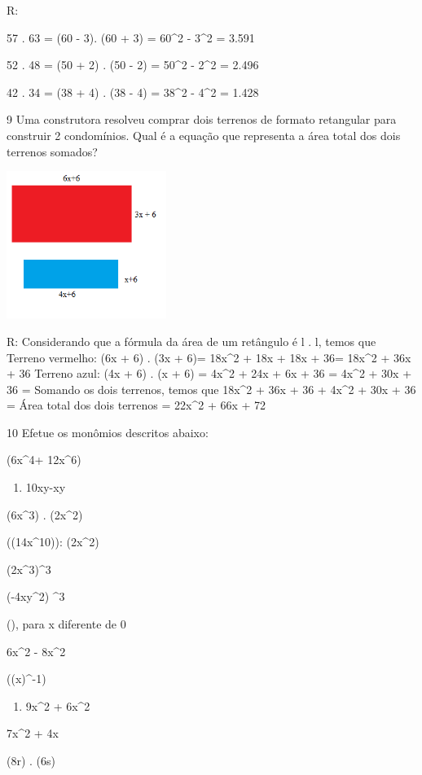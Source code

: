 {R:
\item 57 . 63 = (60 - 3). (60 + 3) = 60^2 - 3^2 = 3.591
\item 52 . 48 = (50 + 2) . (50 - 2) = 50^2 - 2^2 = 2.496
\item 42 . 34 = (38 + 4) . (38 - 4) = 38^2 - 4^2 = 1.428

\num{9} Uma construtora resolveu comprar dois terrenos de formato retangular
para construir 2 condomínios. Qual é a equação que representa a área
total dos dois terrenos somados?

\includegraphics[width=2.04167in,height=1.8873in]{./imgSAEB_8_MAT/media/image5.png}

R: Considerando que a fórmula da área de um retângulo é l . l, temos que
Terreno vermelho:
(6x + 6) . (3x + 6)=
18x^2 + 18x + 18x + 36=
18x^2 + 36x + 36
Terreno azul:
(4x + 6) . (x + 6) =
4x^2 + 24x + 6x + 36 =
4x^2 + 30x + 36 =
Somando os dois terrenos, temos que
18x^2 + 36x + 36 + 4x^2 + 30x + 36 =
Área total dos dois terrenos = 22x^2 + 66x + 72

\num{10} Efetue os monômios descritos abaixo:
\item (6x^4+ 12x^6)

\begin{enumerate}
\def\labelenumi{\alph{enumi})}
\setcounter{enumi}{1}
\tightlist
\item
  10xy-xy
\end{enumerate}
\item(6x^3) . (2x^2)
\item ((14x^{10})): (2x^2)
\item (2x^3)^3
\item (-4xy^2) ^3
\item (), para x diferente de 0
\item 6x^2 - 8x^2
\item((x)^{-1})

\begin{enumerate}
\def\labelenumi{\alph{enumi})}
\setcounter{enumi}{9}
\tightlist
\item
  9x^2 + 6x^2
\end{enumerate}
\item 7x^2 + 4x
\item (8r) . (6s)

}

